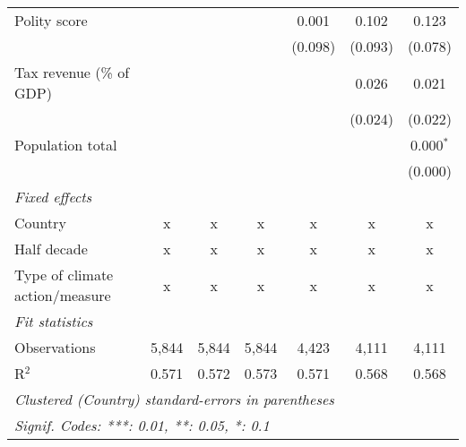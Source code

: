 \begin{tabular}{lcccccc}
   Polity score                                                         &              &                &                & 0.001          & 0.102          & 0.123\\   
                                                                        &              &                &                & (0.098)        & (0.093)        & (0.078)\\   
   Tax revenue (\% of GDP)                                              &              &                &                &                & 0.026          & 0.021\\   
                                                                        &              &                &                &                & (0.024)        & (0.022)\\   
   Population total                                                     &              &                &                &                &                & 0.000$^{*}$\\   
                                                                        &              &                &                &                &                & (0.000)\\   
   \emph{Fixed effects}\\
   Country                                                              & x            & x              & x              & x              & x              & x\\  
   Half decade                                                          & x            & x              & x              & x              & x              & x\\  
   Type of climate action/measure                                       & x            & x              & x              & x              & x              & x\\  
   \midrule \emph{Fit statistics}\\
   Observations                                                         & 5,844        & 5,844          & 5,844          & 4,423          & 4,111          & 4,111\\  
   R$^2$                                                                & 0.571        & 0.572          & 0.573          & 0.571          & 0.568          & 0.568\\  
   \midrule
   \multicolumn{7}{l}{\emph{Clustered (Country) standard-errors in parentheses}}\\
   \multicolumn{7}{l}{\emph{Signif. Codes: ***: 0.01, **: 0.05, *: 0.1}}\\
\end{tabular}
\par\endgroup


